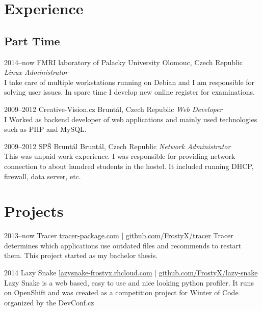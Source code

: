 \documentclass[]{friggeri-cv}
\begin{document}
\section{Experience}
\subsection{Part Time}
\begin{entrylist}

\entry
{2014--now}
{FMRI laboratory of Palacky University}
{Olomouc, Czech Republic}
{\emph{Linux Administrator} \\
I take care of multiple workstations running on Debian and I am responsible for solving user issues. In spare time I develop new online register for examinations.}

\entry
{2009--2012}
{Creative-Vision.cz}
{Bruntál, Czech Republic}
{\emph{Web Developer} \\
I Worked as backend developer of web applications and mainly used technologies such as PHP and MySQL.}

\entry
{2009--2012}
{SPŠ Bruntál}
{Bruntál, Czech Republic}
{\emph{Network Administrator} \\
This was unpaid work experience. I was responsible for providing network connection to about hundred students in the hostel. It included running DHCP, firewall, data server, etc.}

\end{entrylist}


\section{Projects}

\begin{entrylist}

\entry
{2013--now}
{Tracer}
{\href{http://tracer-package.com}{tracer-package.com} | \href{https://github.com/FrostyX/tracer}{github.com/FrostyX/tracer}}
{Tracer determines which applications use outdated files and recommends to restart them. This project started as my bachelor thesis.}

\entry
{2014}
{Lazy Snake}
{\href{http://lazysnake-frostyx.rhcloud.com/}{lazysnake-frostyx.rhcloud.com} | \href{https://github.com/FrostyX/lazy-snake}{github.com/FrostyX/lazy-snake}}
{Lazy Snake is a web based, easy to use and nice looking python profiler. It runs on OpenShift and was created as a competition project for Winter of Code organized by the DevConf.cz}

\end{entrylist}
\end{document}
